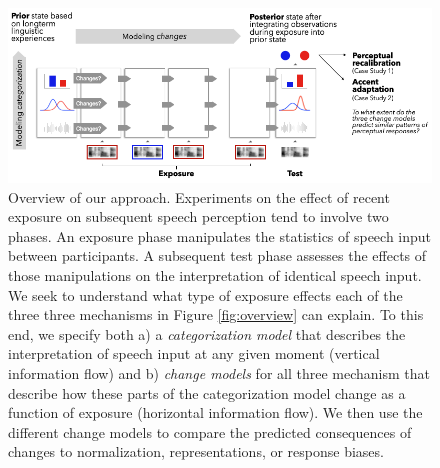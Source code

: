 \documentclass[
  11pt,
  english,
  man,floatsintext]{apa6}
\begin{document}
\begin{figure}[h]
\begin{center}
\includegraphics[width=.99\columnwidth]{../figures/diagrams/overview-of-changes.png}
\caption{Overview of our approach. Experiments on the effect of recent exposure on subsequent speech perception tend to involve two phases. An exposure phase manipulates the statistics of speech input between participants. A subsequent test phase assesses the effects of those manipulations on the interpretation of identical speech input. We seek to understand what type of exposure effects each of the three three mechanisms in Figure \ref{fig:overview} can explain. To this end, we specify both a) a {\em categorization model} that describes the interpretation of speech input at any given moment (vertical information flow) and b) {\em change models} for all three mechanism that describe how these parts of the categorization model change as a function of exposure (horizontal information flow). We then use the different change models to compare the predicted consequences of changes to normalization, representations, or response biases.}\label{fig:overview-change}
\end{center}
\end{figure}
\end{document}
